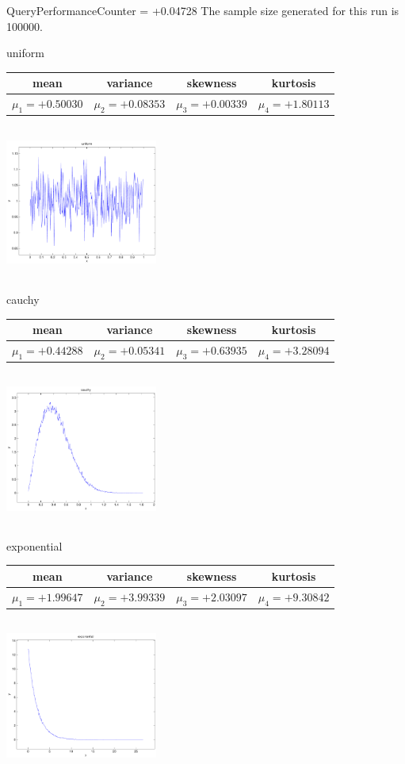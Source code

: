 \documentclass[9pt]{article}
\theoremstyle{plain}
\theoremstyle{definition}
\theoremstyle{remark}
\numberwithin{equation}{section}
\begin{document}
QueryPerformanceCounter  =  +0.04728
The sample size generated for this run is 100000.

\newpage
uniform \begin{tabular}{|c|c|c|c|}  mean & variance & skewness & kurtosis \\  \hline
$\mu_1 = +0.50030$ & $\mu_2 = +0.08353$ & $\mu_3 = +0.00339$ & $\mu_4 =+1.80113$ \\
\end{tabular}

\includegraphics[width=5cm,height=5cm]{uniform.pdf}

cauchy \begin{tabular}{|c|c|c|c|}  mean & variance & skewness & kurtosis \\  \hline
$\mu_1 = +0.44288$ & $\mu_2 = +0.05341$ & $\mu_3 = +0.63935$ & $\mu_4 =+3.28094$ \\
\end{tabular}

\includegraphics[width=5cm,height=5cm]{cauchy.pdf}

exponential \begin{tabular}{|c|c|c|c|}  mean & variance & skewness & kurtosis \\  \hline
$\mu_1 = +1.99647$ & $\mu_2 = +3.99339$ & $\mu_3 = +2.03097$ & $\mu_4 =+9.30842$ \\
\end{tabular}

\includegraphics[width=5cm,height=5cm]{exponential.pdf}
\end{document}
